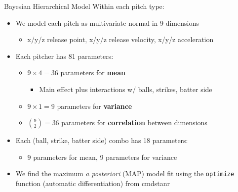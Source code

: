 \documentclass{beamer}
\begin{document}
  \begin{frame}{Bayesian Hierarchical Model}
    Within each pitch type:
    \begin{itemize}
      \item We model each pitch as multivariate normal in 9 dimensions
      \begin{itemize}
        \item x/y/z release point, x/y/z release velocity, x/y/z acceleration
      \end{itemize}
      \item Each pitcher has 81 parameters:
      \begin{itemize}
        \item $9 \times 4 = 36$ parameters for {\bf mean}
        \begin{itemize}
          \item Main effect plus interactions w/ balls, strikes, batter side
        \end{itemize}
        \item $9 \times 1 = 9$ parameters for {\bf variance}
        \item $\binom{9}{2} = 36$ parameters for {\bf correlation} between dimensions
      \end{itemize}
      \item Each (ball, strike, batter side) combo has 18 parameters:
      \begin{itemize}
        \item 9 parameters for mean, 9 parameters for variance
      \end{itemize}
      \item We find the maximum {\it a posteriori} (MAP) model fit using the \texttt{optimize} function (automatic differentiation) from cmdstanr
    \end{itemize}
  \end{frame}
\end{document}
